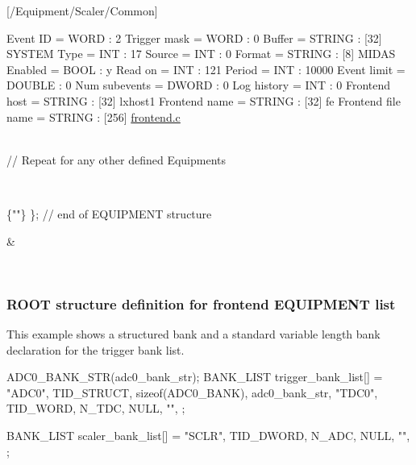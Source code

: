\begin{TabularC}{2}
\begin{DoxyPre}\label{FE_eqdec_FE_scaler_common}
\hypertarget{FE_eqdec_FE_scaler_common}{}

[/Equipment/Scaler/Common]\end{DoxyPre}



\begin{DoxyPre}Event ID = WORD : 2
Trigger mask = WORD : 0
Buffer = STRING : [32] SYSTEM
Type = INT : 17
Source = INT : 0
Format = STRING : [8] MIDAS
Enabled = BOOL : y
Read on = INT : 121
Period = INT : 10000
Event limit = DOUBLE : 0
Num subevents = DWORD : 0
Log history = INT : 0
Frontend host = STRING : [32] lxhost1
Frontend name = STRING : [32] fe
Frontend file name = STRING : [256] \hyperlink{frontend_8c}{frontend.c}
\end{DoxyPre}
  

\\
// Repeat for any other defined Equipments \par
  

\\

\begin{DoxyPre}
     \{""\}
\};              // end of EQUIPMENT structure
\end{DoxyPre}
  &\par
   \\
\end{TabularC}


\label{FE_eqdec_idx_Equipment_declaration_ROOT}
\hypertarget{FE_eqdec_idx_Equipment_declaration_ROOT}{}
 \hypertarget{FE_eqdec_FE_ROOT_Structure_Def}{}\subsubsection{ROOT structure definition for frontend EQUIPMENT list}\label{FE_eqdec_FE_ROOT_Structure_Def}
This example shows a structured bank and a standard variable length bank declaration for the trigger bank list. \par



\begin{DoxyCode}
   ADC0_BANK_STR(adc0_bank_str);
   BANK_LIST trigger_bank_list[] = {
      {"ADC0", TID_STRUCT, sizeof(ADC0_BANK), adc0_bank_str},
      {"TDC0", TID_WORD, N_TDC, NULL},
      {""},
   };

   BANK_LIST scaler_bank_list[] = {
      {"SCLR", TID_DWORD, N_ADC, NULL},
      {""},
   };
\end{DoxyCode}


